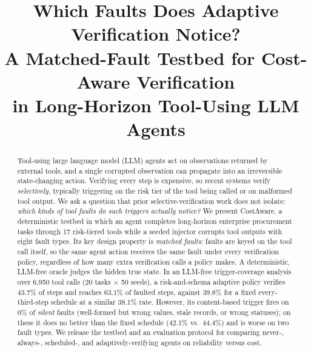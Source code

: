 \documentclass[conference]{IEEEtran}
\begin{document}
\title{Which Faults Does Adaptive Verification Notice?\\
A Matched-Fault Testbed for Cost-Aware Verification\\
in Long-Horizon Tool-Using LLM Agents}

\author{
}

\maketitle

\begin{abstract}
Tool-using large language model (LLM) agents act on observations returned by external
tools, and a single corrupted observation can propagate into an irreversible
state-changing action. Verifying every step is expensive, so recent systems verify
\emph{selectively}, typically triggering on the risk tier of the tool being called or on
malformed tool output. We ask a question that prior selective-verification work does not
isolate: \emph{which kinds of tool faults do such triggers actually notice?} We present
CostAware, a deterministic testbed in which an agent completes long-horizon enterprise
procurement tasks through 17 risk-tiered tools while a seeded injector corrupts tool
outputs with eight fault types. Its key design property is \emph{matched faults}: faults
are keyed on the tool call itself, so the same agent action receives the same fault under
every verification policy, regardless of how many extra verification calls a policy makes.
A deterministic, LLM-free oracle judges the hidden true state. In an LLM-free trigger-coverage
analysis over 6{,}950 tool calls (20 tasks $\times$ 50 seeds), a risk-and-schema adaptive policy
verifies 43.7\% of steps and reaches 63.1\% of faulted steps, against 39.8\% for a fixed
every-third-step schedule at a similar 38.1\% rate. However, its content-based trigger fires on
0\% of \emph{silent} faults (well-formed but wrong values, stale records, or wrong statuses);
on these it does no better than the fixed schedule (42.1\% vs.\ 44.4\%) and is worse on two
fault types. We release the testbed and an evaluation protocol for comparing never-, always-,
scheduled-, and adaptively-verifying agents on reliability versus cost.
\end{abstract}
\end{document}
